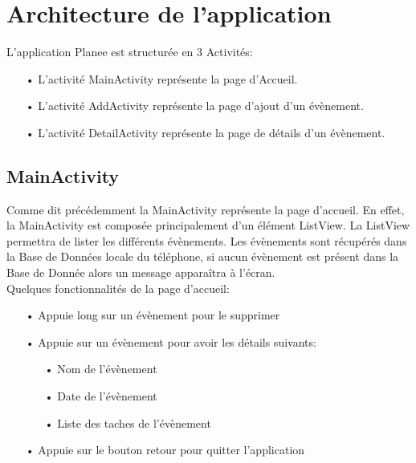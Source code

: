 \documentclass[12pt,a4paper]{report}
\begin{document}
\section{Architecture de l'application}
\begin{flushleft}
\justify
L'application Planee est structurée en 3 Activités:
\begin{itemize}
\item[•] L'activité MainActivity représente la page d'Accueil.
\item[•] L'activité AddActivity représente la page d'ajout d'un évènement.
\item[•] L'activité DetailActivity représente la page de détails d'un évènement.
\end{itemize}
\end{flushleft}
\subsection{MainActivity}
\begin{flushleft}
\justify
Comme dit précédemment la MainActivity représente la page d'accueil. En effet, la MainActivity est composée principalement d'un élément ListView. La ListView permettra de lister les différents évènements. Les évènements sont récupérés dans la Base de Données locale du téléphone, si aucun évènement est présent dans la Base de Donnée alors un message apparaîtra à l'écran.\\

Quelques fonctionnalités de la page d'accueil:
\begin{itemize}
\item[•] Appuie long sur un évènement pour le supprimer
\item[•] Appuie sur un évènement pour avoir les détails suivants:
\begin{itemize}
\item[•] Nom de l'évènement
\item[•] Date de l'évènement
\item[•] Liste des taches de l'évènement
\end{itemize}
\item[•] Appuie sur le bouton retour pour quitter l'application
\end{itemize}
\end{flushleft}
\end{document}
